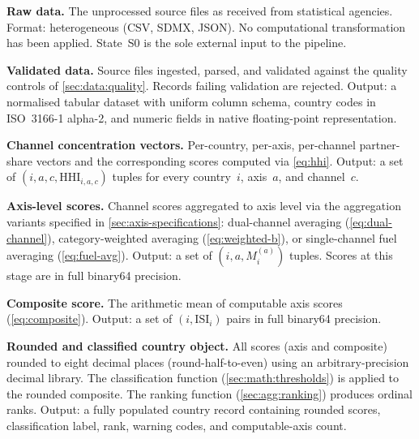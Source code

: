 \begin{description}[style=nextline, leftmargin=4em, labelwidth=3.5em]

  \item[\textbf{S0}] \textbf{Raw data.}\enspace
    The unprocessed source files as received from statistical agencies.
    Format: heterogeneous (CSV, SDMX, JSON).  No computational
    transformation has been applied.  State~S0 is the sole external
    input to the pipeline.

  \item[\textbf{S1}] \textbf{Validated data.}\enspace
    Source files ingested, parsed, and validated against the quality
    controls of \cref{sec:data:quality}.  Records failing validation are
    rejected.  Output: a normalised tabular dataset with uniform column
    schema, country codes in ISO~3166-1 alpha-2, and numeric fields in
    native floating-point representation.

  \item[\textbf{S2}] \textbf{Channel concentration vectors.}\enspace
    Per-country, per-axis, per-channel partner-share vectors and the
    corresponding \HHI scores computed via \cref{eq:hhi}.  Output: a set
    of \((i, a, c, \mathrm{HHI}_{i,a,c})\) tuples for every country~\(i\),
    axis~\(a\), and channel~\(c\).

  \item[\textbf{S3}] \textbf{Axis-level scores.}\enspace
    Channel scores aggregated to axis level via the aggregation variants
    specified in \cref{sec:axis-specifications}: dual-channel averaging
    (\cref{eq:dual-channel}), category-weighted averaging
    (\cref{eq:weighted-b}), or single-channel fuel averaging
    (\cref{eq:fuel-avg}).  Output: a set of \((i, a, M_i^{(a)})\) tuples.
    Scores at this stage are in full binary64 precision.

  \item[\textbf{S4}] \textbf{Composite score.}\enspace
    The arithmetic mean of computable axis scores
    (\cref{eq:composite}).  Output: a set of \((i, \mathrm{ISI}_i)\) pairs
    in full binary64 precision.

  \item[\textbf{S5}] \textbf{Rounded and classified country object.}\enspace
    All scores (axis and composite) rounded to eight decimal places
    (round-half-to-even) using an arbitrary-precision decimal library.
    The classification function (\cref{sec:math:thresholds}) is applied to
    the rounded composite.  The ranking function (\cref{sec:agg:ranking})
    produces ordinal ranks.  Output: a fully populated country record
    containing rounded scores, classification label, rank, warning codes,
    and computable-axis count.


\end{description}
